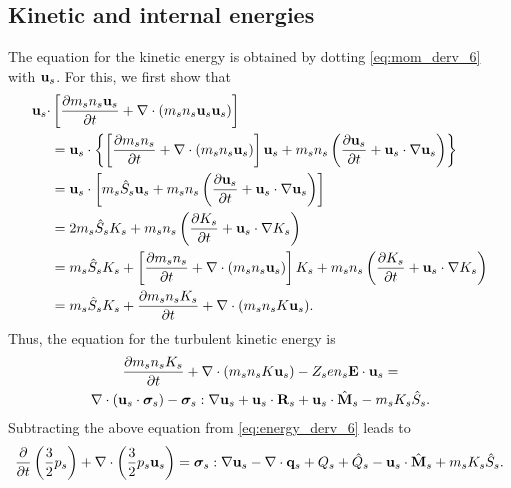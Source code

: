 \documentclass[a4paper,11pt]{report}
\begin{document}
\subsection{Kinetic and internal energies}
The equation for the kinetic energy is obtained by dotting \cref{eq:mom_derv_6} with $\mathbf{u}_s$. For this, we first show that
\begin{align}
    \mathbf{u}_s \cdot &\left [ \frac{\partial m_s n_s \mathbf{u}_s}{\partial t} + \nabla \cdot \left ( m_s n_s \mathbf{u}_s \mathbf{u}_s \right) \right ] \\
    & =\mathbf{u}_s \cdot \left \{ \left [ \frac{\partial m_s n_s }{\partial t} + \nabla \cdot \left ( m_s n_s \mathbf{u}_s \right) \right] \mathbf{u}_s  + m_s n_s \left ( \frac{\partial \mathbf{u}_s}{\partial t} + \mathbf{u}_s \cdot \nabla \mathbf{u}_s \right ) \right \}\\
    & =\mathbf{u}_s \cdot \left [ m_s \hat{S}_s \mathbf{u}_s  + m_s n_s \left ( \frac{\partial \mathbf{u}_s}{\partial t} + \mathbf{u}_s \cdot \nabla \mathbf{u}_s \right ) \right ] \\
    & =2 m_s \hat{S}_s K_s + m_s n_s \left ( \frac{\partial K_s}{\partial t} + \mathbf{u}_s \cdot \nabla K_s \right) \\
    & =m_s \hat{S}_s K_s + \left [ \frac{\partial m_s n_s}{\partial t} + \nabla \cdot \left (m_s n_s \mathbf{u}_s \right ) \right] K_s + m_s n_s \left ( \frac{\partial K_s}{\partial t} + \mathbf{u}_s \cdot \nabla K_s \right) \\
    & =m_s \hat{S}_s K_s + \frac{\partial m_s n_s K_s}{\partial t} + \nabla \cdot ( m_s n_s K \mathbf{u}_s ).
\end{align}
Thus, the equation for the turbulent kinetic energy is
\begin{multline}
\frac{\partial m_s n_s K_s}{\partial t} + \nabla \cdot ( m_s n_s K \mathbf{u}_s ) - Z_s e n_s \mathbf{E} \cdot \mathbf{u}_s =\\
\nabla \cdot (\mathbf{u}_s \cdot \bm \sigma_s ) - \bm \sigma_s : \nabla \mathbf{u}_s + \mathbf{u}_s \cdot \mathbf{R}_s + \mathbf{u}_s \cdot \hat{\mathbf{M}}_s - m_s K_s \hat{S}_s .
\end{multline}
Subtracting the above equation from \cref{eq:energy_derv_6} leads to 
\begin{equation}
\frac{\partial}{\partial t} \left ( \frac{3}{2} p_s \right ) + \nabla \cdot \left ( \frac{3}{2} p_s \mathbf{u}_s \right ) = \bm \sigma_s : \nabla \mathbf{u}_s - \nabla \cdot \mathbf{q}_s + Q_{s} + \hat{Q}_s - \mathbf{u}_s \cdot \hat{\mathbf{M}}_s + m_s K_s \hat{S}_s .
\end{equation}
\end{document}
